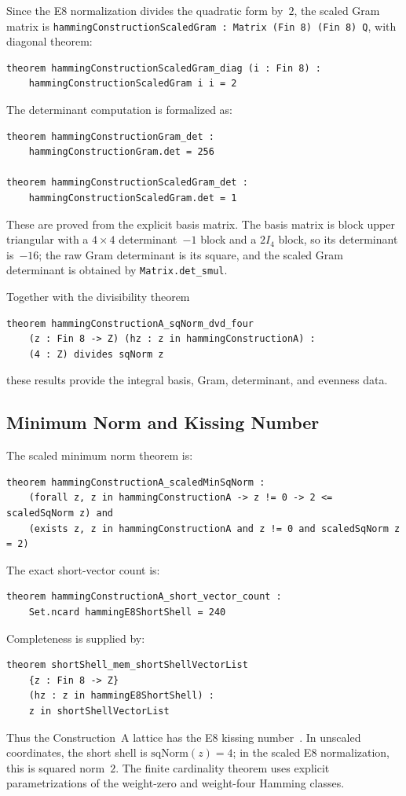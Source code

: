 \documentclass[12pt]{article}
\theoremstyle{definition}
\newcommand{\code}[1]{\texttt{#1}}
\begin{document}
Since the E8 normalization divides the quadratic form by~$2$, the scaled Gram
matrix is \code{hammingConstructionScaledGram : Matrix (Fin 8) (Fin 8) Q},
with diagonal theorem:
\begin{lstlisting}[style=lean]
theorem hammingConstructionScaledGram_diag (i : Fin 8) :
    hammingConstructionScaledGram i i = 2
\end{lstlisting}

The determinant computation is formalized as:
\begin{lstlisting}[style=lean]
theorem hammingConstructionGram_det :
    hammingConstructionGram.det = 256

theorem hammingConstructionScaledGram_det :
    hammingConstructionScaledGram.det = 1
\end{lstlisting}
These are proved from the explicit basis matrix.  The basis matrix is block
upper triangular with a $4\times 4$ determinant~$-1$ block and a $2I_4$ block,
so its determinant is~$-16$; the raw Gram determinant is its square, and the
scaled Gram determinant is obtained by \code{Matrix.det\_smul}.

Together with the divisibility theorem
\begin{lstlisting}[style=lean]
theorem hammingConstructionA_sqNorm_dvd_four
    (z : Fin 8 -> Z) (hz : z in hammingConstructionA) :
    (4 : Z) divides sqNorm z
\end{lstlisting}
these results provide the integral basis, Gram, determinant, and evenness data.

\subsection{Minimum Norm and Kissing Number}

The scaled minimum norm theorem is:
\begin{lstlisting}[style=lean]
theorem hammingConstructionA_scaledMinSqNorm :
    (forall z, z in hammingConstructionA -> z != 0 -> 2 <= scaledSqNorm z) and
    (exists z, z in hammingConstructionA and z != 0 and scaledSqNorm z = 2)
\end{lstlisting}

The exact short-vector count is:
\begin{lstlisting}[style=lean]
theorem hammingConstructionA_short_vector_count :
    Set.ncard hammingE8ShortShell = 240
\end{lstlisting}

Completeness is supplied by:
\begin{lstlisting}[style=lean]
theorem shortShell_mem_shortShellVectorList
    {z : Fin 8 -> Z}
    (hz : z in hammingE8ShortShell) :
    z in shortShellVectorList
\end{lstlisting}
Thus the Construction~A lattice has the E8 kissing number~\cite{ConwaySloane1999}.
In unscaled coordinates, the short shell is $\mathrm{sqNorm}(z) = 4$; in the
scaled E8 normalization, this is squared norm~$2$.  The finite cardinality
theorem uses explicit parametrizations of the weight-zero and weight-four
Hamming classes.
\end{document}

